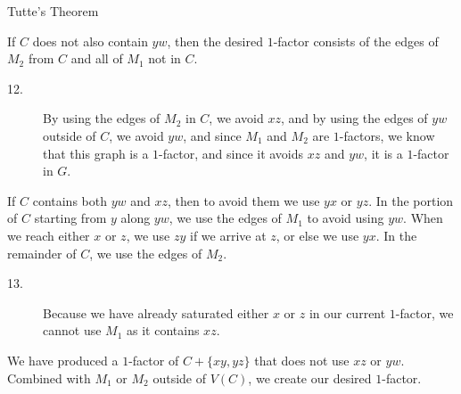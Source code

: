 \documentclass[9pt]{extarticle}
\begin{document}
{\begin{problem}{Tutte's Theorem}
\begin{description}[font=\scshape]
        If $C$ does not also contain $yw$, then the desired $1$-factor consists of the edges of $M_2$ from $C$ and all of $M_1$ not in $C$.
        \begin{description}
          \item[12.] By using the edges of $M_2$ in $C$, we avoid $xz$, and by using the edges of $yw$ outside of $C$, we avoid $yw$, and since $M_1$ and $M_2$ are $1$-factors, we know that this graph is a $1$-factor, and since it avoids $xz$ and $yw$, it is a $1$-factor in $G$.
        \end{description}
        If $C$ contains both $yw$ and $xz$, then to avoid them we use $yx$ or $yz$. In the portion of $C$ starting from $y$ along $yw$, we use the edges of $M_1$ to avoid using $yw$. When we reach either $x$ or $z$, we use $zy$ if we arrive at $z$, or else we use $yx$. In the remainder of $C$, we use the edges of $M_2$.
        \begin{description}
          \item[13.] Because we have already saturated either $x$ or $z$ in our current $1$-factor, we cannot use $M_1$ as it contains $xz$.
        \end{description}
        We have produced a $1$-factor of $C + \{xy,yz\}$ that does not use $xz$ or $yw$. Combined with $M_1$ or $M_2$ outside of $V(C)$, we create our desired $1$-factor.
    \end{description}
  \end{problem}
}
\end{document}
